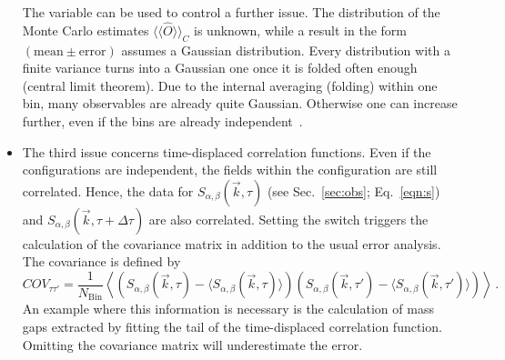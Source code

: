 \begin{itemize}
The  variable can be used to control a further issue. The distribution of the Monte Carlo estimates $\langle\langle\hat{O}\rangle\rangle_C$ is unknown, while a result in the form $(\mathrm{mean}\pm \mathrm{error})$ assumes a Gaussian distribution. Every distribution with a finite variance turns into a Gaussian one once it is folded often enough (central limit theorem). Due to the internal averaging (folding) within one bin, many observables are already quite Gaussian. Otherwise one can increase  further, even if the bins are already independent~\cite{Bercx17}.
	\item The third issue concerns time-displaced correlation functions. Even if the configurations are independent, the fields within the configuration are still correlated. Hence, the data for $S_{\alpha,\beta}(\vec{k},\tau)$ (see Sec.~\ref{sec:obs}; Eq.~\eqref{eqn:s}) and $S_{\alpha,\beta}(\vec{k},\tau+\Delta\tau)$ are also correlated. Setting the switch  triggers the calculation of the covariance matrix in addition to the usual error analysis. The covariance is defined by
	\begin{equation}
		COV_{\tau\tau'}=\frac{1}{N_{\text{Bin}}}\left\langle
		\left( S_{\alpha,\beta}(\vec{k},\tau) - \big\langle S_{\alpha,\beta}(\vec{k},\tau)\big\rangle \right)
		\left(S_{\alpha,\beta}(\vec{k},\tau')-\big\langle S_{\alpha,\beta}(\vec{k},\tau')\big\rangle \right)  \right\rangle\,.
	\end{equation}
An example where this information is necessary is the  calculation of mass gaps extracted by fitting the  tail  of the time-displaced correlation function.  Omitting  the covariance matrix will  underestimate the  error.
\end{itemize}


%
